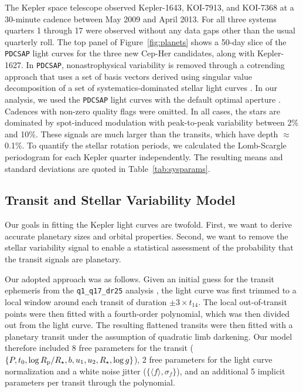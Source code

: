 \documentclass[12pt,twocolumn,linenumbers]{aastex63}
\begin{document}
The Kepler space telescope observed Kepler-1643, KOI-7913, and
KOI-7368 at a 30-minute cadence between May 2009 and April 2013.  For
all three systems quarters 1 through 17 were observed without any data
gaps other than the usual quarterly roll.  The top panel of
Figure~\ref{fig:planets} shows a 50-day slice of the \texttt{PDCSAP}
light curves for the three new Cep-Her candidates, along with
Kepler-1627.  In \texttt{PDCSAP}, nonastrophysical variability is
removed through a cotrending approach that uses a set of basis vectors
derived using singular value decomposition of a set of
systematics-dominated stellar light curves
\citep{smith_kepler_PDC_2017}.  In our analysis, we used the
\texttt{PDCSAP} light curves with the default optimal aperture
\citep{smith_finding_2016}.  Cadences with non-zero quality flags were
omitted.  In all cases, the stars are dominated by spot-induced
modulation with peak-to-peak variability between 2\% and 10\%.  These
signals are much larger than the transits, which have depth
$\approx$0.1\%.
To quantify the stellar rotation periods, we calculated the
Lomb-Scargle periodogram for each Kepler quarter independently.  The
resulting means and standard deviations are quoted in
Table~\ref{tab:sysparams}.


\subsection{Transit and Stellar Variability Model}
\label{sec:fitting}

Our goals in fitting the Kepler light curves are twofold.  First, we
want to derive accurate planetary sizes and orbital properties.
Second, we want to remove the stellar variability signal to enable a
statistical assessment of the probability that the transit signals are
planetary.

Our adopted approach was as follows.  Given an initial guess for the
transit ephemeris from the \texttt{q1\_q17\_dr25} analysis
\citep{thompson_planetary_2018}, the light curve was first trimmed to
a local window around each transit of duration $\pm 3\times t_{14}$.
The local out-of-transit points were then fitted with a fourth-order
polynomial, which was then divided out from the light curve.  The
resulting flattened transits were then fitted with a 
planetary transit under the assumption of quadratic limb darkening.
Our model therefore included 8 free parameters for the transit ($\{P,
t_0, \log R_{\rm p}/R_\star, b, u_1 ,u_2, R_\star, \log g\}$), 2 free
parameters for the light curve normalization and a white noise jitter
($\{\langle f \rangle, \sigma_f \}$), and an additional 5 implicit
parameters per transit through the polynomial.
\end{document}
